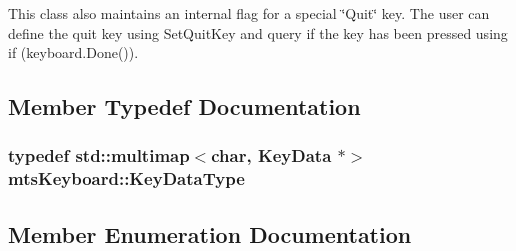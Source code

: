 This class also maintains an internal flag for a special \char`\"{}\+Quit\char`\"{} key. The user can define the quit key using Set\+Quit\+Key and query if the key has been pressed using if (keyboard.\+Done()). 

\subsection{Member Typedef Documentation}
\hypertarget{classmts_keyboard_a48126bc1793ac0b9c701cdb3cb9c3881}{}
\subsubsection[{Key\+Data\+Type}]{\setlength{\rightskip}{0pt plus 5cm}typedef std\+::multimap$<$char, {\bf Key\+Data} $\ast$$>$ {\bf mts\+Keyboard\+::\+Key\+Data\+Type}\hspace{0.3cm}{\ttfamily [protected]}}\label{classmts_keyboard_a48126bc1793ac0b9c701cdb3cb9c3881}


\subsection{Member Enumeration Documentation}
\hypertarget{classmts_keyboard_a4a455c544287ea2a16f3353a5fe379c4}{}
